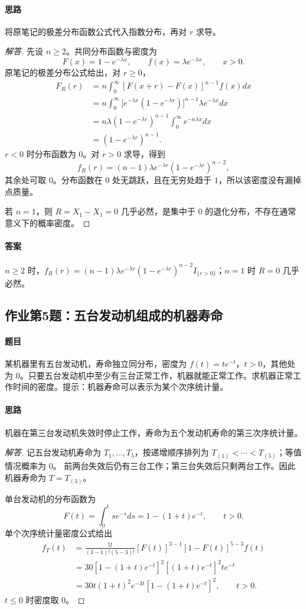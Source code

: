 \paragraph{思路}将原笔记的极差分布函数公式代入指数分布，再对 $r$ 求导。
\begin{proof}[解答]
先设 $n\geq2$。共同分布函数与密度为
\[
F(x)=1-e^{-\lambda x},\qquad f(x)=\lambda e^{-\lambda x},\qquad x>0.
\]
原笔记的极差分布公式给出，对 $r\geq0$，
\begin{align*}
F_R(r)
&=n\int_0^\infty[F(x+r)-F(x)]^{n-1}f(x)dx\\
&=n\int_0^\infty
\bigl[e^{-\lambda x}(1-e^{-\lambda r})\bigr]^{n-1}
\lambda e^{-\lambda x}dx\\
&=n\lambda(1-e^{-\lambda r})^{n-1}\int_0^\infty e^{-n\lambda x}dx\\
&=(1-e^{-\lambda r})^{n-1}.
\end{align*}
$r<0$ 时分布函数为 $0$。对 $r>0$ 求导，得到
\[
f_R(r)=(n-1)\lambda e^{-\lambda r}(1-e^{-\lambda r})^{n-2},
\]
其余处可取 $0$。分布函数在 $0$ 处无跳跃，且在无穷处趋于 $1$，所以该密度没有漏掉点质量。

若 $n=1$，则 $R=X_1-X_1=0$ 几乎必然，是集中于 $0$ 的退化分布，不存在通常意义下的概率密度。
\end{proof}
\paragraph{答案}$n\geq2$ 时，$f_R(r)=(n-1)\lambda e^{-\lambda r}(1-e^{-\lambda r})^{n-2}I_{\{r>0\}}$；$n=1$ 时 $R=0$ 几乎必然。

\subsection{作业第5题：五台发动机组成的机器寿命}\label{ex:w12-h5}
\paragraph{题目}
某机器里有五台发动机，寿命独立同分布，密度为 $f(t)=te^{-t}$，$t>0$，其他处为 $0$。只要五台发动机中至少有三台正常工作，机器就能正常工作。求机器正常工作时间的密度。提示：机器寿命可以表示为某个次序统计量。
\paragraph{思路}机器在第三台发动机失效时停止工作，寿命为五个发动机寿命的第三次序统计量。
\begin{proof}[解答]
记五台发动机寿命为 $T_1,\ldots,T_5$，按递增顺序排列为 $T_{(1)}<\cdots<T_{(5)}$；等值情况概率为 $0$。
前两台失效后仍有三台工作；第三台失效后只剩两台工作。因此机器寿命为 $T=T_{(3)}$。

单台发动机的分布函数为
\[
F(t)=\int_0^t se^{-s}ds=1-(1+t)e^{-t},\qquad t>0.
\]
单个次序统计量密度公式给出
\begin{align*}
f_T(t)
&=\frac{5!}{(3-1)!(5-3)!}[F(t)]^{3-1}[1-F(t)]^{5-3}f(t)\\
&=30[1-(1+t)e^{-t}]^2[(1+t)e^{-t}]^2te^{-t}\\
&=30t(1+t)^2e^{-3t}[1-(1+t)e^{-t}]^2,\qquad t>0.
\end{align*}
$t\leq0$ 时密度取 $0$。
\end{proof}
